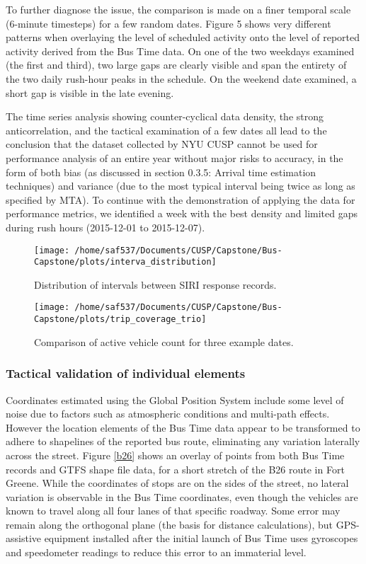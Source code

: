 \documentclass[12pt]{report}
\begin{document}
\vspace{0.5 cm}

To further diagnose the issue, the comparison is made on a finer temporal scale (6-minute timesteps) for a few random dates.  Figure 5 shows very different patterns when overlaying the level of scheduled activity onto the level of reported activity derived from the Bus Time data.  On one of the two weekdays examined  (the first and third), two large gaps are clearly visible and span the entirety of the two daily rush-hour peaks in the schedule.  On the weekend date examined, a short gap is visible in the late evening.

The time series analysis showing counter-cyclical data density, the strong anticorrelation, and the tactical examination of a few dates all lead to the conclusion that the dataset collected by NYU CUSP cannot be used for performance analysis of an entire year without major risks to accuracy, in the form of both bias (as discussed in section 0.3.5: Arrival time estimation techniques) and variance (due to the most typical interval being twice as long as specified by MTA).  To continue with the demonstration of applying the data for performance metrics, we identified a week with the best density and limited gaps during rush hours (2015-12-01 to 2015-12-07).     
        
\begin{figure}[!ht]
	\label{intervals}
  	\caption{Distribution of intervals between SIRI response records.}
  	\centering
    \texttt{[image: /home/saf537/Documents/CUSP/Capstone/Bus-Capstone/plots/interva\_distribution]}
\end{figure}

\begin{figure}[!ht]
	\label{trio}
  	\caption{Comparison of active vehicle count for three example dates.}
  	\centering
    \texttt{[image: /home/saf537/Documents/CUSP/Capstone/Bus-Capstone/plots/trip\_coverage\_trio]}
\end{figure}


\subsubsection*{Tactical validation of individual elements}


Coordinates estimated using the Global Position System include some level of noise due to factors such as atmospheric conditions and multi-path effects. However the location elements of the Bus Time data appear to be transformed to adhere to shapelines of the reported bus route, eliminating any variation laterally across the street. Figure \ref{b26} shows an overlay of points from both Bus Time records and GTFS shape file data, for a short stretch of the B26 route in Fort Greene.  While the coordinates of stops are on the sides of the street, no lateral variation is observable in the Bus Time coordinates, even though the vehicles are known to travel along all four lanes of that specific roadway. Some error may remain along the orthogonal plane (the basis for distance calculations), but GPS-assistive equipment installed after the initial launch of Bus Time uses gyroscopes and speedometer readings to reduce this error to an immaterial level.
\end{document}
